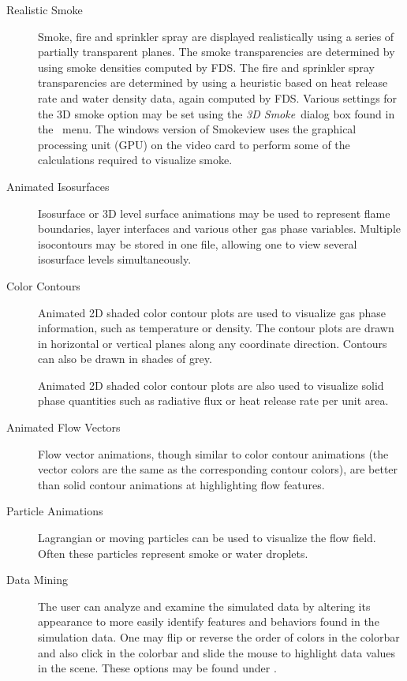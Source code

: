 \documentclass[11pt,twoside]{book}
\newcommand{\frameit}[1]{\fbox{\tt #1}}
\begin{document}
\begin{description}
\item[Realistic Smoke] Smoke, fire and sprinkler spray are displayed
realistically using a series of partially transparent planes.  The
smoke transparencies are determined by using smoke densities
computed by FDS.  The fire and sprinkler spray transparencies are
determined by using a heuristic based on heat release rate and
water density data, again computed by FDS. Various settings for
the 3D smoke option may be set using the {\em 3D Smoke}\ dialog
box found in the \frameit{Dialogs}\ menu.  The windows version of
Smokeview uses the graphical processing unit (GPU) on the video
card to perform some of the calculations required to visualize smoke.

\item[Animated Isosurfaces] Isosurface or 3D level surface
animations may be used to represent flame boundaries, layer
interfaces and various other gas phase variables. Multiple
isocontours may be stored in one file, allowing one to
view several isosurface levels simultaneously.

\item[Color Contours] Animated 2D shaded color contour plots are
used to visualize gas phase information, such as temperature or
density. The contour plots are drawn in horizontal or vertical
planes along any coordinate direction.  Contours can also be drawn
in shades of grey.

Animated 2D shaded color contour plots are also used to
visualize solid phase quantities such as radiative flux or
heat release rate per unit area.

\item[Animated Flow Vectors] Flow vector animations, though
similar to color contour animations (the vector colors are
the same as the corresponding contour colors), are better
than solid contour animations at highlighting flow
features.

\item[Particle Animations] Lagrangian or moving particles can be
used to visualize the flow field. Often these particles represent
smoke or water droplets.

\item[Data Mining] The user can analyze and examine the simulated
data by altering its appearance to more easily identify features
and behaviors found in the simulation data. One may flip or
reverse the order of colors in the colorbar and also click in the
colorbar and slide the mouse to highlight data values in the
scene. These options may be found under \frameit{Options/Shades}.


\end{description}
\end{document}
